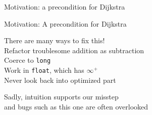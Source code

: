 \documentclass[usenames, xcolor=dvipsnames]{beamer}
\begin{document}
\begin{frame}{Motivation: a precondition for Dijkstra}
{}
\bigskip
{}

\end{frame}

\begin{frame}{Motivation: A precondition for Dijkstra}

There are many ways to fix this!
\\ \hspace{1em} Refactor troublesome addition as subtraction
\\ \hspace{1em} Coerce to \texttt{long}
\\ \hspace{1em} Work in \texttt{float}, which has $\infty^{+}$
\\ \hspace{1em} Never look back into optimized part

\bigskip

\pause Sadly, intuition supports our misstep \\
and bugs such as this one are often overlooked

\end{frame}
\end{document}
